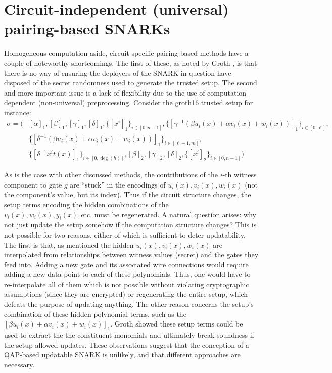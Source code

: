 \section{Circuit-independent (universal) pairing-based SNARKs}
\noindent Homogeneous computation aside, circuit-specific pairing-based methods have a couple of noteworthy shortcomings. The first of these, as noted by Groth \cite{grothupdatable}, is that there is no way of ensuring the deployers of the SNARK in question have disposed of the secret randomness used to generate the trusted setup. The second and more important issue is a lack of flexibility due to the use of computation-dependent (non-universal) preprocessing. Consider the groth16 trusted setup for instance: 
\begin{align}
\sigma = \Big( 
    &[\alpha]_1, [\beta]_1, [\gamma]_1, [\delta]_1, \{[x^i]_1\}_{i \in [0, n-1]}, \{[\gamma^{-1}(\beta u_i(x) + \alpha v_i(x) + w_i(x))]_1\}_{i \in [0, \ell]}, \\
    &\{[\delta^{-1}(\beta u_i(x) + \alpha v_i(x) + w_i(x))]_1\}_{i \in [\ell+1, m]}, \\
    &\{[\delta^{-1} x^i t(x)]_1\}_{i \in [0, \deg(h)]}, [\beta]_2, [\gamma]_2, [\delta]_2, \{[x^i]_2\}_{i \in [0, n-1]}
\Big)
\end{align}

\noindent As is the case with other discussed methods, the contributions of the $i$-th witness component to gate $g$ are ``stuck'' in the encodings of $u_i(x), v_i(x), w_i(x)$ (not the component's value, but its index). Thus if the circuit structure changes, the setup terms encoding the hidden combinations of the $v_i(x), w_i(x), y_i(x), \text{etc.}$ must be regenerated. A natural question arises: why not just update the setup somehow if the computation structure changes? This is not possible for two reasons, either of which is sufficient to deter updatability. The first is that, as mentioned the hidden $u_i(x), v_i(x), w_i(x)$ are interpolated from relationships between witness values (secret) and the gates they feed into. Adding a new gate and its associated wire connections would require adding a new data point to each of these polynomials. Thus, one would have to re-interpolate all of them which is not possible without violating cryptographic assumptions (since they are encrypted) or regenerating the entire setup, which defeats the purpose of updating anything. The other reason concerns the setup's combination of these hidden polynomial terms, such as the $[\beta u_i(x) + \alpha v_i(x) + w_i(x)]_1$. Groth \cite{grothupdatable} showed these setup terms could be used to extract the the constituent monomials and ultimately break soundness if the setup allowed updates. These observations suggest that the conception of a QAP-based updatable SNARK is unlikely, and that different approaches are necessary.\\

